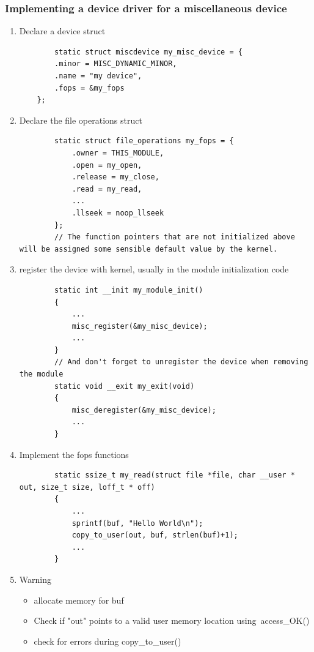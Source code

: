\documentclass[12pt]{article}
\begin{document}
\subsubsection{Implementing a device driver for a miscellaneous device}
\begin{enumerate}
    \item  Declare a device struct \begin{lstlisting}
        static struct miscdevice my_misc_device = {
        .minor = MISC_DYNAMIC_MINOR,
        .name = "my device",
        .fops = &my_fops
    };
    \end{lstlisting}
    \item Declare the file operations struct \begin{lstlisting}
        static struct file_operations my_fops = {
            .owner = THIS_MODULE,
            .open = my_open,
            .release = my_close,
            .read = my_read,
            ...
            .llseek = noop_llseek
        };
        // The function pointers that are not initialized above will be assigned some sensible default value by the kernel.
    \end{lstlisting}
    \item register the device with kernel, usually in the module initialization code \begin{lstlisting}
        static int __init my_module_init()
        {
            ...
            misc_register(&my_misc_device);
            ...
        }
        // And don't forget to unregister the device when removing the module
        static void __exit my_exit(void)
        {
            misc_deregister(&my_misc_device);
            ...
        }
    \end{lstlisting}
    \item Implement the fops functions \begin{lstlisting}
        static ssize_t my_read(struct file *file, char __user * out, size_t size, loff_t * off)
        {
            ...
            sprintf(buf, "Hello World\n");
            copy_to_user(out, buf, strlen(buf)+1);
            ...
        }
    \end{lstlisting}
    \item Warning \begin{itemize}
        \item allocate memory for buf
        \item Check if "out" points to a valid user memory location using\ access\_OK()
        \item check for errors during copy\_to\_user()
    \end{itemize}
\end{enumerate}
\end{document}
